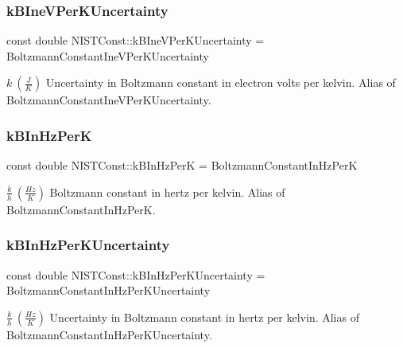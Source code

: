 \subsubsection{\texorpdfstring{k\+B\+Ine\+V\+Per\+K\+Uncertainty}{kBIneVPerKUncertainty}}
{\footnotesize\ttfamily const double N\+I\+S\+T\+Const\+::k\+B\+Ine\+V\+Per\+K\+Uncertainty = Boltzmann\+Constant\+Ine\+V\+Per\+K\+Uncertainty}

$k \ (\frac{J}{K})$ Uncertainty in Boltzmann constant in electron volts per kelvin. Alias of Boltzmann\+Constant\+Ine\+V\+Per\+K\+Uncertainty. \mbox{\label{group___n_i_s_t_const-_boltzmann_constant_gaa7a3aa5798c9617d09120f8041c93433}} 
\subsubsection{\texorpdfstring{k\+B\+In\+Hz\+PerK}{kBInHzPerK}}
{\footnotesize\ttfamily const double N\+I\+S\+T\+Const\+::k\+B\+In\+Hz\+PerK = Boltzmann\+Constant\+In\+Hz\+PerK}

$\frac{k}{h} \ (\frac{Hz}{K})$ Boltzmann constant in hertz per kelvin. Alias of Boltzmann\+Constant\+In\+Hz\+PerK. \mbox{\label{group___n_i_s_t_const-_boltzmann_constant_gacee490b0a8b778a3a5f381be776f493e}} 
\subsubsection{\texorpdfstring{k\+B\+In\+Hz\+Per\+K\+Uncertainty}{kBInHzPerKUncertainty}}
{\footnotesize\ttfamily const double N\+I\+S\+T\+Const\+::k\+B\+In\+Hz\+Per\+K\+Uncertainty = Boltzmann\+Constant\+In\+Hz\+Per\+K\+Uncertainty}

$\frac{k}{h} \ (\frac{Hz}{K})$ Uncertainty in Boltzmann constant in hertz per kelvin. Alias of Boltzmann\+Constant\+In\+Hz\+Per\+K\+Uncertainty. \mbox{\label{group___n_i_s_t_const-_boltzmann_constant_ga54bf445c848dc6dc425076bf6ab45d83}} 
